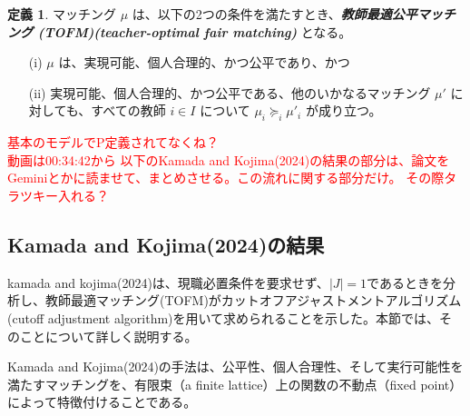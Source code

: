 \documentclass[12pt, a4paper]{article}
\theoremstyle{definition}
\newtheorem{defn}{定義}
\theoremstyle{remark}
\theoremstyle{plain}
\begin{document}
  



\begin{defn}
マッチング $\mu$ は、以下の2つの条件を満たすとき、\textbf{\textit{教師最適公平マッチング (TOFM)(teacher-optimal fair matching) }} となる。
\begin{itemize}
    \item[(i)] $\mu$ は、実現可能、個人合理的、かつ公平であり、かつ
    \item[(ii)] 実現可能、個人合理的、かつ公平である、他のいかなるマッチング $\mu'$ に対しても、すべての教師 $i \in I$ について $\mu_i \succeq_i \mu'_i$ が成り立つ。
\end{itemize}
\end{defn}




\textcolor{red}{基本のモデルでP定義されてなくね？\\
  動画は00:34:42から 以下のKamada and Kojima(2024)の結果の部分は、論文をGeminiとかに読ませて、まとめさせる。この流れに関する部分だけ。 その際タラツキー入れる？}

\subsection{Kamada and Kojima(2024)の結果}
kamada and kojima(2024)は、現職必置条件を要求せず、$|J| = 1$であるときを分析し、教師最適マッチング(TOFM)がカットオフアジャストメントアルゴリズム(cutoff adjustment algorithm)を用いて求められることを示した。本節では、そのことについて詳しく説明する。




Kamada and Kojima(2024)の手法は、公平性、個人合理性、そして実行可能性を満たすマッチングを、有限束（a finite lattice）上の関数の不動点（fixed point）によって特徴付けることである。
\end{document}
